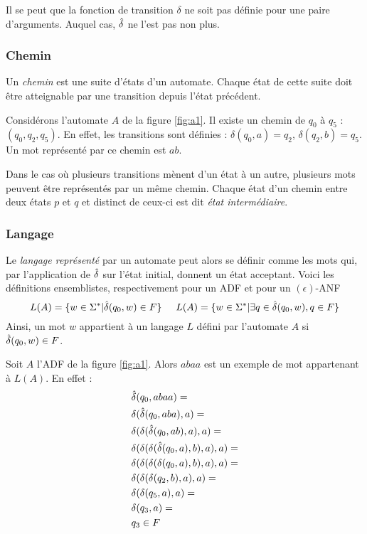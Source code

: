 Il se peut que la fonction de transition $\delta$ ne soit pas définie pour une paire d'arguments. Auquel cas, $\hat{\delta}$ ne l'est pas non plus.\\

\subsubsection*{Chemin}

Un \emph{chemin} est une suite d'états d'un automate. Chaque état de cette suite doit être atteignable par une transition depuis l'état précédent.

\begin{example}[Chemin]
 Considérons l'automate $A$ de la figure \ref{fig:a1}. Il existe un chemin de $q_0$ à $q_5$ : $(q_0,q_2,q_5)$. En effet, les transitions sont définies : $\delta(q_0, a)=q_2$, $\delta(q_2, b)=q_5$. Un mot représenté par ce chemin est $ab$.
\end{example}

Dans le cas où plusieurs transitions mènent d'un état à un autre, plusieurs mots peuvent être représentés par un même chemin.
Chaque état d'un chemin entre deux états $p$ et $q$ et distinct de ceux-ci est dit \emph{état intermédiaire}.

\subsubsection*{Langage}
Le \emph{langage représenté} par un automate \automaton peut alors se définir comme les mots qui, par l'application de $\hat{\delta}$ sur l'état initial, donnent un état acceptant. Voici les définitions ensemblistes, respectivement pour un ADF et pour un $(\epsilon)$-ANF
$$
L(A)= \{w \in \Sigma^* | \hat{\delta}(q_0,w) \in F\} \hspace{0.5cm}
L(A)= \{w \in \Sigma^* | \exists q \in \hat{\delta}(q_0,w), q \in F\}
$$
Ainsi, un mot $w$ appartient à un langage $L$ défini par l'automate $A$ si $\hat{\delta}(q_0,w) \in F$.

\begin{example}
  Soit $A$ l'ADF de la figure \ref{fig:a1}. Alors $abaa$ est un exemple de mot appartenant à $L(A)$. En effet :
  \begin{align*}
    &\hat{\delta}(q_0,abaa)=\\
    &\delta(\hat{\delta}(q_0,aba),a)=\\
    &\delta(\delta(\hat{\delta}(q_0,ab),a),a)=\\
    &\delta(\delta(\delta(\hat{\delta}(q_0,a),b),a),a)=\\
    &\delta(\delta(\delta(\delta(q_0,a),b),a),a)=\\
    &\delta(\delta(\delta(q_2,b),a),a)=\\
    &\delta(\delta(q_5,a),a)=\\
    &\delta(q_3,a)=\\
    &q_3 \in F
  \end{align*}
\end{example}

